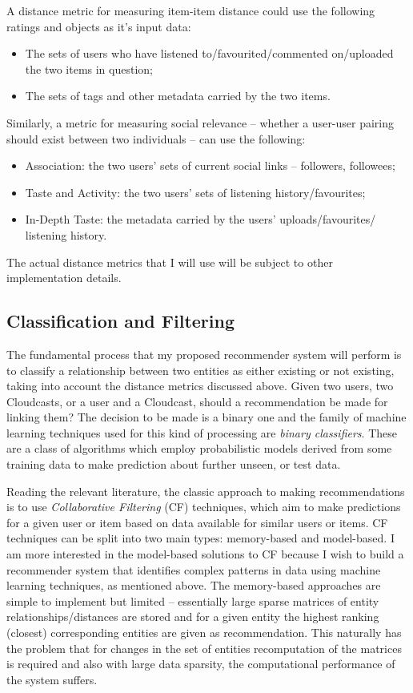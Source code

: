 A distance metric for measuring item-item distance could use the following 
ratings and objects as it's input data: 
\begin{itemize}
 \item The sets of users who have listened to/favourited/commented on/uploaded 
the two items in question;
 \item The sets of tags and other metadata carried by the two items.
\end{itemize}


Similarly, a metric for measuring social relevance -- whether a user-user 
pairing should exist between two individuals -- can use the following:
\begin{itemize}
 \item Association: the two users' sets of current social links -- followers, 
followees; 
 \item Taste and Activity: the two users' sets of listening history/favourites;
 \item In-Depth Taste: the metadata carried by the users' uploads/favourites/
listening history.
\end{itemize}

The actual distance metrics that I will use will be subject to other 
implementation details. 

\subsection*{Classification and Filtering}

The fundamental process that my proposed recommender system will perform is to 
classify a relationship between two entities as either existing or not 
existing, taking into account the distance metrics discussed above. Given two 
users, two Cloudcasts, or a user and a Cloudcast, should a recommendation be 
made for linking them? The decision to be made is a binary one and the family 
of machine learning techniques used for this kind of processing are 
\emph{binary classifiers}. These are a class of algorithms which employ 
probabilistic models derived from some training data to make prediction about 
further unseen, or test data.

Reading the relevant literature, the classic approach to making recommendations 
is to use \emph{Collaborative Filtering} (CF) techniques, which aim to make 
predictions for a given user or item based on data available for similar users 
or items. CF techniques can be split into two main types: memory-based and 
model-based. I am more interested in the model-based solutions to CF because I 
wish to build a recommender system that identifies complex patterns in data 
using machine learning techniques, as mentioned above. The memory-based 
approaches are simple to implement but limited -- essentially large sparse 
matrices of entity relationships/distances are stored and for a given entity 
the highest ranking (closest) corresponding entities are given as 
recommendation. This naturally has the problem that for changes in the set of 
entities recomputation of the matrices is required and also with large data 
sparsity, the computational performance of the system suffers.

